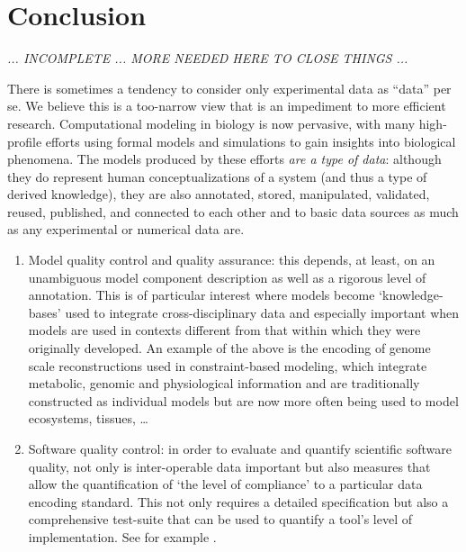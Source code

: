 \section{Conclusion}

\emph{... INCOMPLETE ... MORE NEEDED HERE TO CLOSE THINGS ...}

There is sometimes a tendency to consider only experimental data as ``data'' per se.  We believe this is a too-narrow view that is an impediment to more efficient research.  Computational modeling in biology is now pervasive, with many high-profile efforts using formal models and simulations to gain insights into biological phenomena.  The models produced by these efforts \emph{are a type of data}: although they do represent human conceptualizations of a system (and thus a type of derived knowledge), they are also annotated, stored, manipulated, validated, reused, published, and connected to each other and to basic data sources as much as any experimental or numerical data are.

%
\begin{enumerate}

 \item Model quality control and quality assurance: this depends, at least, on an unambiguous model component description as well as a rigorous level of annotation. This is of particular interest where models become `knowledge-bases' used to integrate cross-disciplinary data and especially important when models are used in contexts different from that within which they were originally developed. An example of the above is the encoding of genome scale reconstructions used in constraint-based modeling, which integrate metabolic, genomic and physiological information and are traditionally constructed as individual models but are now more often being used to model ecosystems, tissues, \ldots

 \item Software quality control: in order to evaluate and quantify scientific software quality, not only is inter-operable data important but also measures that allow the quantification of `the level of compliance' to a particular data encoding standard. This not only requires a detailed specification but also a comprehensive test-suite that can be used to quantify a tool's level of implementation. See for example \cite{Artaza2016}.
 
\end{enumerate}

